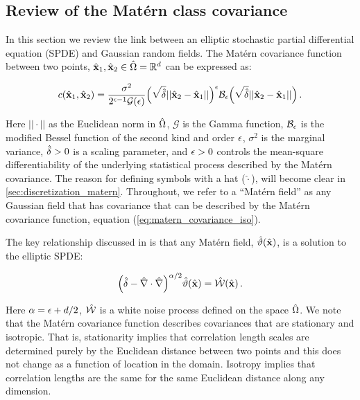 \subsection{Review of the Mat\'ern class covariance}
\label{ssec:matern_review}

In this section we review the link between an elliptic stochastic partial
differential equation (SPDE) and Gaussian random fields.
The Mat\'ern covariance function between two points, $\hat{\mathbf{x}}_1,\hat{\mathbf{x}}_2\in\hat{\Omega} =
\mathbb{R}^{d}$ can be expressed as:
\begin{linenomath}\begin{equation}
    c(\hat{\mathbf{x}}_1,\hat{\mathbf{x}}_2) = \dfrac{\sigma^2}{2^{\epsilon-1}
    \mathcal{G}(\epsilon)}
    \Big(\sqrt{\hat{\delta}} ||\hat{\mathbf{x}}_2-\hat{\mathbf{x}}_1||\Big)^{\epsilon}
    \mathcal{B}_{\epsilon}
    \Big(\sqrt{\hat{\delta}} ||\hat{\mathbf{x}}_2-\hat{\mathbf{x}}_1||\Big) \, .
    \label{eq:matern_covariance_iso}
\end{equation}\end{linenomath}
Here $||\cdot||$ as the Euclidean norm in $\hat{\Omega}$,
$\mathcal{G}$ is the Gamma function,
$\mathcal{B}_{\epsilon}$ is the modified
Bessel function of the second kind and order $\epsilon$,
$\sigma^2$ is the
marginal variance, $\hat{\delta}>0$ is a scaling parameter, and $\epsilon>0$
controls the mean-square differentiability of the underlying statistical process
described by the Mat\'ern covariance.
The reason for defining symbols with a hat ($\hat{\cdot}$), will become clear
in \cref{sec:discretization_matern}.
Throughout, we refer to a ``Mat\'ern field'' as any Gaussian field that has
covariance that can be described by the Mat\'ern covariance function,
equation (\ref{eq:matern_covariance_iso}).

The key relationship discussed in \citet{RSSB:RSSB777} is that any Mat\'ern field,
$\hat{\vartheta}(\hat{\mathbf{x}})$, is a solution to the elliptic SPDE:
\begin{linenomath}\begin{equation}
    \Big(\hat{\delta} - \hat{\nabla}\cdot\hat{\nabla}\Big)^{\alpha/2}\hat{\vartheta}(\hat{\mathbf{x}}) =
    \hat{\mathcal{W}}(\hat{\mathbf{x}}) \, .
    \label{eq:spde_iso}
\end{equation}\end{linenomath}
Here $\alpha = \epsilon + d/2$,
$\hat{\mathcal{W}}$ is a white noise process defined on the space $\hat{\Omega}$.
We note that the Mat\'ern covariance function describes covariances that are
stationary and isotropic.
That is, stationarity implies that correlation length scales are determined
purely by the Euclidean distance between two points and this does not change as
a function of location in the domain.
Isotropy implies that correlation lengths are the same for the same Euclidean
distance along any dimension.

